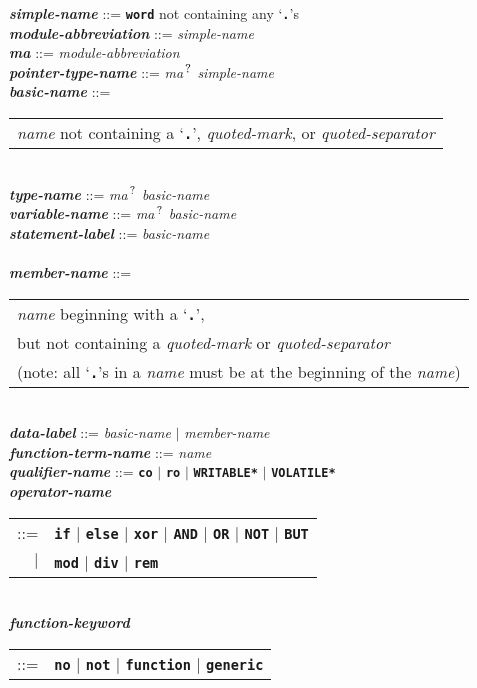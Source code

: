 \documentclass[12pt]{article}
\newcommand{\TT}[1]{{\tt \bfseries #1}}
\newcommand{\QMARK}{{$^{\,\mbox{\footnotesize ?}}$}}
\newcommand{\MA}{{\em ma}\QMARK}
\newcommand{\ttkey}[1]{{\tt \bfseries #1}}
\newcommand{\emkey}[1]{{\em \bfseries #1}}
\newenvironment{indpar}[1][0.3in]%
	{\begin{list}{}%
		     {\setlength{\itemsep}{0in}%
		      \setlength{\topsep}{0in}%
		      \setlength{\parsep}{1ex}%
		      \setlength{\labelwidth}{#1}%
		      \setlength{\leftmargin}{#1}%
		      \addtolength{\leftmargin}{\labelsep}}%
	 \item}%
	{\end{list}}
\begin{document}
\begin{indpar}
\emkey{simple-name} ::= \TT{word} not containing any `\TT{.}'s \\
\emkey{module-abbreviation} ::= {\em simple-name} \\
\emkey{ma} ::= {\em module-abbreviation} \\
\emkey{pointer-type-name}\label{POINTER-TYPE-NAME} ::=
    \MA{} {\em simple-name}
\\[1ex]
\emkey{basic-name}
	::= \begin{tabular}[t]{@{}l@{}}
	    {\em name} not containing a `\TT{.}', {\em quoted-mark}, or
	    {\em quoted-separator}
	    \end{tabular} \\
\emkey{type-name}\label{TYPE-NAME} ::=
    \MA{} {\em basic-name} \\
\emkey{variable-name}\label{VARIABLE-NAME} ::=
    \MA{} {\em basic-name} \\
\emkey{statement-label} ::= {\em basic-name}
    \label{STATEMENT-LABEL} \\
\\[1ex]
\emkey{member-name}\label{MEMBER-NAME}
	::= \begin{tabular}[t]{@{}l@{}}
                        {\em name} beginning with a `\TT{.}', \\
			but not containing a {\em quoted-mark} or
			    {\em quoted-separator} \\
			(note: all `\TT{.}'s in a {\em name} must be at
			 the beginning of the {\em name})
			\end{tabular} \\
\emkey{data-label}\label{DATA-LABEL} ::=
    {\em basic-name} $|$ {\em member-name}
\\[1ex]
\emkey{function-term-name} ::= {\em name}
    \label{FUNCTION-TERM-NAME}
\\[1ex]
\emkey{qualifier-name}\label{QUALIFIER-NAME} ::=
    \ttkey{co} $|$ \ttkey{ro} $|$ \ttkey{*WRITABLE*} $|$ \ttkey{*VOLATILE*}
\\[1ex]
\emkey{operator-name}
    \begin{tabular}[t]{rl}
    ::= & \TT{if} $|$ \TT{else}
                  $|$ \TT{xor} $|$ \TT{AND} $|$ \TT{OR}
		  $|$ \TT{NOT} $|$ \TT{BUT}  \\
    $|$ & \TT{mod} $|$ \TT{div} $|$ \TT{rem}
    \end{tabular}
\\[1ex]
\emkey{function-keyword}
    \begin{tabular}[t]{rl}
    ::= & \TT{no} $|$ \TT{not} $|$ \TT{function} $|$ \TT{generic} \\

\end{tabular}
\end{indpar}
\end{document}
